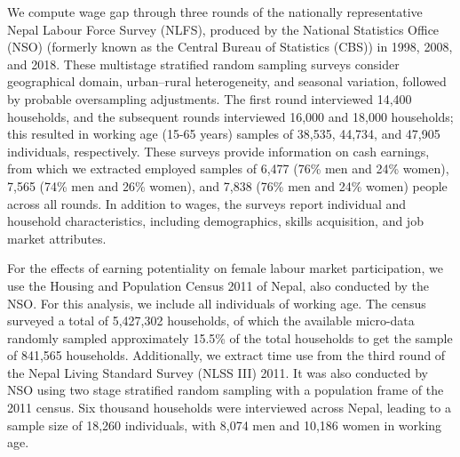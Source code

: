 We compute wage gap through three rounds of the nationally representative Nepal Labour Force Survey (NLFS), produced by the National Statistics Office (NSO) (formerly known as the Central Bureau of Statistics (CBS)) in 1998, 2008, and 2018. These multistage stratified random sampling surveys consider geographical domain, urban–rural heterogeneity, and seasonal variation, followed by probable oversampling adjustments. The first round interviewed 14,400 households, and the subsequent rounds interviewed 16,000 and 18,000 households; this resulted in working age (15-65 years) samples of 38,535, 44,734, and 47,905 individuals, respectively. These surveys provide information on cash earnings, from which we extracted employed samples of 6,477 (76\% men and 24\% women), 7,565 (74\% men and 26\% women), and 7,838 (76\% men and 24\% women) people across all rounds. In addition to wages, the surveys report individual and household characteristics, including demographics, skills acquisition, and job market attributes.\par

For the effects of earning potentiality on female labour market participation, we use the Housing and Population Census 2011 of Nepal, also conducted by the NSO. For this analysis, we include all individuals of working age. The census surveyed a total of 5,427,302 households, of which the available micro-data randomly sampled approximately 15.5\% of the total households to get the sample of 841,565 households. Additionally, we extract time use from the third round of the Nepal Living Standard Survey (NLSS III) 2011. It was also conducted by NSO using two stage stratified random sampling with a population frame of the 2011 census. Six thousand households were interviewed across Nepal, leading to a sample size of 18,260 individuals, with 8,074 men and 10,186 women in working age.\par  

 
                            
